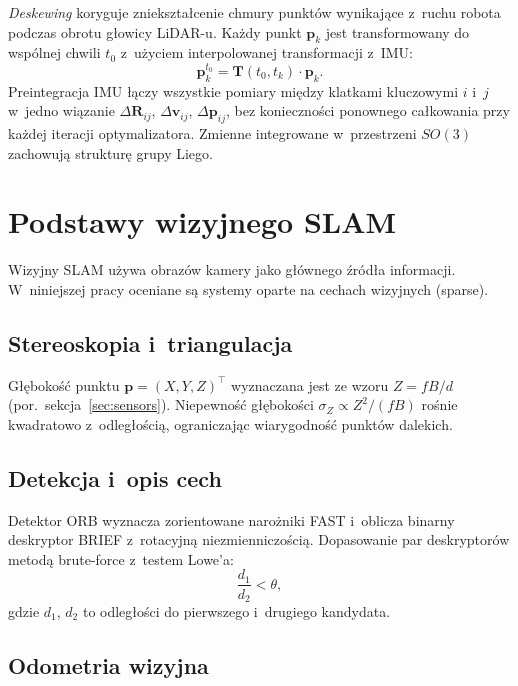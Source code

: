 \textit{Deskewing} koryguje zniekształcenie chmury punktów wynikające z~ruchu
robota podczas obrotu głowicy LiDAR-u.
Każdy punkt $\mathbf{p}_k$ jest transformowany do wspólnej chwili $t_0$
z~użyciem interpolowanej transformacji z~IMU:
\begin{equation}
    \mathbf{p}_k^{t_0} = \mathbf{T}(t_0, t_k) \cdot \mathbf{p}_k.
\end{equation}
Preintegracja IMU łączy wszystkie pomiary między klatkami kluczowymi $i$ i~$j$
w~jedno wiązanie $\Delta\mathbf{R}_{ij}$, $\Delta\mathbf{v}_{ij}$, $\Delta\mathbf{p}_{ij}$,
bez konieczności ponownego całkowania przy każdej iteracji optymalizatora.
Zmienne integrowane w~przestrzeni $SO(3)$ zachowują strukturę grupy Liego.

\section{Podstawy wizyjnego SLAM}

Wizyjny SLAM używa obrazów kamery jako głównego źródła informacji.
W~niniejszej pracy oceniane są systemy oparte na cechach wizyjnych (sparse).

\subsection{Stereoskopia i~triangulacja}

Głębokość punktu $\mathbf{p} = (X, Y, Z)^\top$ wyznaczana jest ze wzoru
$Z = fB/d$ (por.\ sekcja~\ref{sec:sensors}).
Niepewność głębokości $\sigma_Z \propto Z^2 / (fB)$ rośnie kwadratowo
z~odległością, ograniczając wiarygodność punktów dalekich.

\subsection{Detekcja i~opis cech}

Detektor ORB wyznacza zorientowane narożniki FAST i~oblicza binarny deskryptor
BRIEF z~rotacyjną niezmienniczością.
Dopasowanie par deskryptorów metodą brute-force z~testem Lowe'a:
\begin{equation}
    \frac{d_1}{d_2} < \theta,
\end{equation}
gdzie $d_1$, $d_2$ to odległości do pierwszego i~drugiego kandydata.

\subsection{Odometria wizyjna}

